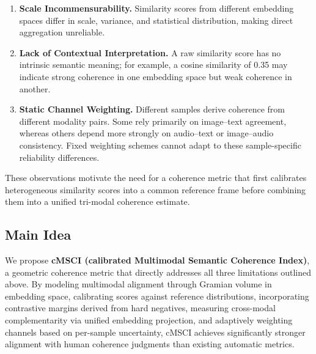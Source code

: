 \documentclass[a4paper,fleqn]{cas-sc}
\begin{document}
\begin{enumerate}
    \item \textbf{Scale Incommensurability.} Similarity scores from different embedding spaces differ in scale, variance, and statistical distribution, making direct aggregation unreliable.

    \item \textbf{Lack of Contextual Interpretation.} A raw similarity score has no intrinsic semantic meaning; for example, a cosine similarity of 0.35 may indicate strong coherence in one embedding space but weak coherence in another.

    \item \textbf{Static Channel Weighting.} Different samples derive coherence from different modality pairs. Some rely primarily on image--text agreement, whereas others depend more strongly on audio--text or image--audio consistency. Fixed weighting schemes cannot adapt to these sample-specific reliability differences.
\end{enumerate}

These observations motivate the need for a coherence metric that first calibrates heterogeneous similarity scores into a common reference frame before combining them into a unified tri-modal coherence estimate.
\subsection{Main Idea}\label{sec:main-idea}

We propose \textbf{cMSCI (calibrated Multimodal Semantic Coherence Index)}, a geometric coherence metric that directly addresses all three limitations outlined above. By modeling multimodal alignment through Gramian volume in embedding space, calibrating scores against reference distributions, incorporating contrastive margins derived from hard negatives, measuring cross-modal complementarity via unified embedding projection, and adaptively weighting channels based on per-sample uncertainty, cMSCI achieves significantly stronger alignment with human coherence judgments than existing automatic metrics.
\end{document}
